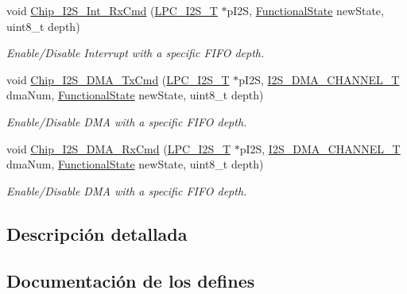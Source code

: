 \begin{DoxyCompactItemize}
void \hyperlink{group___i2_s__18_x_x__43_x_x_ga36b0f5c62d5c703c1374bdcc0d84d07f}{Chip\+\_\+\+I2\+S\+\_\+\+Int\+\_\+\+Rx\+Cmd} (\hyperlink{struct_l_p_c___i2_s___t}{L\+P\+C\+\_\+\+I2\+S\+\_\+T} $\ast$p\+I2S, \hyperlink{group___l_p_c___types___public___types_gac9a7e9a35d2513ec15c3b537aaa4fba1}{Functional\+State} new\+State, uint8\+\_\+t depth)
\begin{DoxyCompactList}\small\item\em Enable/\+Disable Interrupt with a specific F\+I\+FO depth. \end{DoxyCompactList}\item 
void \hyperlink{group___i2_s__18_x_x__43_x_x_gac08890ba38fd8e5df3a3a603e7a4fa42}{Chip\+\_\+\+I2\+S\+\_\+\+D\+M\+A\+\_\+\+Tx\+Cmd} (\hyperlink{struct_l_p_c___i2_s___t}{L\+P\+C\+\_\+\+I2\+S\+\_\+T} $\ast$p\+I2S, \hyperlink{group___i2_s__18_x_x__43_x_x_gac04c1583101ddd661886d9677683421b}{I2\+S\+\_\+\+D\+M\+A\+\_\+\+C\+H\+A\+N\+N\+E\+L\+\_\+T} dma\+Num, \hyperlink{group___l_p_c___types___public___types_gac9a7e9a35d2513ec15c3b537aaa4fba1}{Functional\+State} new\+State, uint8\+\_\+t depth)
\begin{DoxyCompactList}\small\item\em Enable/\+Disable D\+MA with a specific F\+I\+FO depth. \end{DoxyCompactList}\item 
void \hyperlink{group___i2_s__18_x_x__43_x_x_ga9c7067a9ee62d240aa6cd9426deefb13}{Chip\+\_\+\+I2\+S\+\_\+\+D\+M\+A\+\_\+\+Rx\+Cmd} (\hyperlink{struct_l_p_c___i2_s___t}{L\+P\+C\+\_\+\+I2\+S\+\_\+T} $\ast$p\+I2S, \hyperlink{group___i2_s__18_x_x__43_x_x_gac04c1583101ddd661886d9677683421b}{I2\+S\+\_\+\+D\+M\+A\+\_\+\+C\+H\+A\+N\+N\+E\+L\+\_\+T} dma\+Num, \hyperlink{group___l_p_c___types___public___types_gac9a7e9a35d2513ec15c3b537aaa4fba1}{Functional\+State} new\+State, uint8\+\_\+t depth)
\begin{DoxyCompactList}\small\item\em Enable/\+Disable D\+MA with a specific F\+I\+FO depth. \end{DoxyCompactList}\end{DoxyCompactItemize}


\subsection{Descripción detallada}


\subsection{Documentación de los \textquotesingle{}defines\textquotesingle{}}
